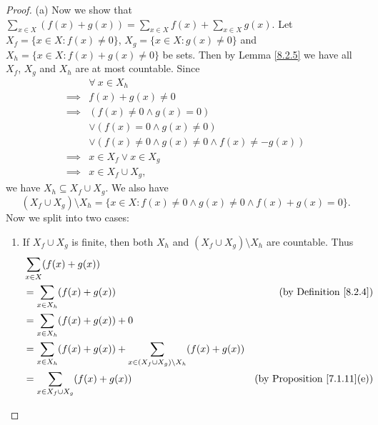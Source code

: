 \begin{proof}{(a)}
    Now we show that \(\sum_{x \in X} (f(x) + g(x)) = \sum_{x \in X} f(x) + \sum_{x \in X} g(x)\).
    Let \(X_f = \{x \in X : f(x) \neq 0\}\), \(X_g = \{x \in X : g(x) \neq 0\}\) and \(X_h = \{x \in X : f(x) + g(x) \neq 0\}\) be sets.
    Then by Lemma \ref{8.2.5} we have all \(X_f\), \(X_g\) and \(X_h\) are at most countable.
    Since
    \begin{align*}
                 & \forall\ x \in X_h                                         \\
        \implies & f(x) + g(x) \neq 0                                         \\
        \implies & (f(x) \neq 0 \land g(x) = 0)                               \\
                 & \lor (f(x) = 0 \land g(x) \neq 0)                          \\
                 & \lor (f(x) \neq 0 \land g(x) \neq 0 \land f(x) \neq -g(x)) \\
        \implies & x \in X_f \lor x \in X_g                                   \\
        \implies & x \in X_f \cup X_g,
    \end{align*}
    we have \(X_h \subseteq X_f \cup X_g\).
    We also have
    \[
        (X_f \cup X_g) \setminus X_h = \{x \in X : f(x) \neq 0 \land g(x) \neq 0 \land f(x) + g(x) = 0\}.
    \]
    Now we split into two cases:
    \begin{enumerate}[label=(\Roman*)]
        \item If \(X_f \cup X_g\) is finite, then both \(X_h\) and \((X_f \cup X_g) \setminus X_h\) are countable.
              Thus
              \begin{align*}
                   & \sum_{x \in X} (f(x) + g(x))                                                                                                         \\
                   & = \sum_{x \in X_h} (f(x) + g(x))                                                           & \text{(by Definition \ref{8.2.4})}      \\
                   & = \sum_{x \in X_h} (f(x) + g(x)) + 0                                                                                                 \\
                   & = \sum_{x \in X_h} (f(x) + g(x)) + \sum_{x \in (X_f \cup X_g) \setminus X_h} (f(x) + g(x))                                           \\
                   & = \sum_{x \in X_f \cup X_g} (f(x) + g(x))                                                  & \text{(by Proposition \ref{7.1.11}(e))} \\

\end{align*}
\end{enumerate}
\end{proof}
